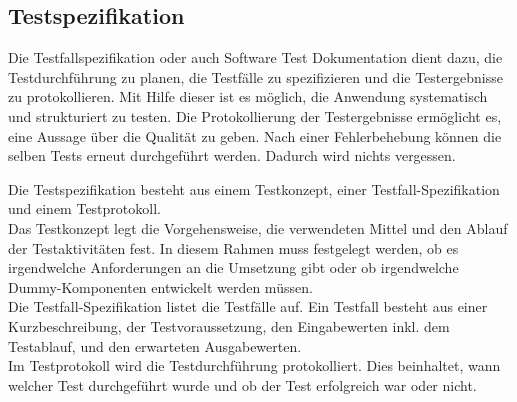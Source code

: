 \subsection{Testspezifikation}  \label{Testspezifikation}

Die Testfallspezifikation oder auch Software Test Dokumentation dient dazu, die Testdurchführung zu planen, die Testfälle 
zu spezifizieren und die Testergebnisse zu protokollieren. Mit Hilfe dieser ist es möglich, die Anwendung systematisch 
und strukturiert zu testen. Die Protokollierung der Testergebnisse ermöglicht es, eine Aussage über die Qualität zu geben.
Nach einer Fehlerbehebung können die selben Tests erneut durchgeführt werden. Dadurch wird nichts vergessen.

Die Testspezifikation besteht aus einem Testkonzept, einer Testfall-Spezifikation und einem Testprotokoll.\\
Das Testkonzept legt die Vorgehensweise, die verwendeten Mittel und den Ablauf der Testaktivitäten fest. In diesem Rahmen
muss festgelegt werden, ob es irgendwelche Anforderungen an die Umsetzung gibt oder ob irgendwelche Dummy-Komponenten 
entwickelt werden müssen.\\
Die Testfall-Spezifikation listet die Testfälle auf. Ein Testfall besteht aus einer Kurzbeschreibung, der Testvoraussetzung, 
den Eingabewerten inkl. dem Testablauf, und den erwarteten Ausgabewerten.\\
Im Testprotokoll wird die Testdurchführung protokolliert. Dies beinhaltet, wann welcher Test durchgeführt wurde und ob 
der Test erfolgreich war oder nicht.